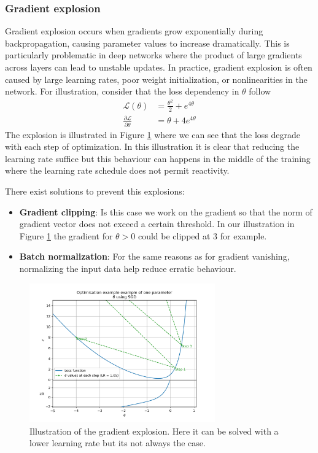 \documentclass[../main.tex]{subfiles}
\begin{document}
\subsubsection{Gradient explosion}
Gradient explosion occurs when gradients grow exponentially during backpropagation, causing parameter values to increase dramatically. This is particularly problematic in deep networks where the product of large gradients across layers can lead to unstable updates. In practice, gradient explosion is often caused by large learning rates, poor weight initialization, or nonlinearities in the network.
For illustration, consider that the loss dependency in $\theta$ follow
\begin{align*}
  \mathcal{L}(\theta) &= \frac{\theta^2}{2} + e^{4\theta} \\
  \frac{\partial \mathcal{L}}{\partial \theta} &= \theta + 4e^{4\theta}
\end{align*}
The explosion is illustrated in Figure \ref{fig:ml:explosion} where we can see that the loss degrade with each step of optimization. In this illustration it is clear that reducing the learning rate suffice but this behaviour can happens in the middle of the training where the learning rate schedule does not permit reactivity.

There exist solutions to prevent this explosions:
\begin{itemize}
  \item \textbf{Gradient clipping}: Is this case we work on the gradient so that the norm of gradient vector does not exceed a certain threshold. In our illustration in Figure \ref{fig:ml:explosion} the gradient for $\theta > 0$ could be clipped at 3 for example.
  \item \textbf{Batch normalization}: For the same reasons as for gradient vanishing, normalizing the input data help reduce erratic behaviour.
\end{itemize}


\begin{figure}[ht]
  \centering
  \includegraphics[height=6cm]{scripts/plots/MSE_explosion_illustration.png}
  \caption{Illustration of the gradient explosion. Here it can be solved with a lower learning rate but its not always the case.}
  \label{fig:ml:explosion}
\end{figure}
\end{document}
